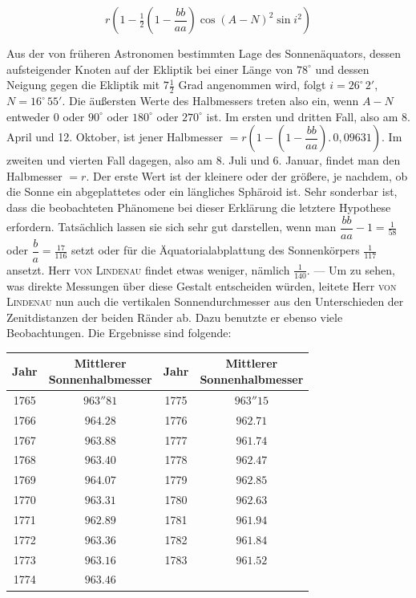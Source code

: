 \[ r\left(1-\tfrac{1}{2}\left(1-\frac{bb}{aa}\right)\cos(A-N)^2\sin i^2\right) \]

Aus der von früheren Astronomen bestimmten Lage des Sonnenäquators, dessen aufsteigender Knoten auf der Ekliptik bei einer Länge von $78^\circ$ und dessen Neigung gegen die Ekliptik mit $7\tfrac{1}{2}$ Grad angenommen wird, folgt $i = 26^\circ \, 2'$, $N = 16^\circ \, 55'$. Die äußersten Werte des Halbmessers treten also ein, wenn $A-N$ entweder $0$ oder $90^\circ$ oder $180^\circ$ oder $270^\circ$ ist. Im ersten und dritten Fall, also am 8. April und 12. Oktober, ist jener Halbmesser $= r\left(1-\left(1-\dfrac{bb}{aa}\right).\,0{,}09631\right)$. Im zweiten und vierten Fall dagegen, also am 8. Juli und 6. Januar, findet man den Halbmesser $= r$. Der erste Wert ist der kleinere oder der größere, je nachdem, ob die Sonne ein abgeplattetes oder ein längliches Sphäroid ist. Sehr sonderbar ist, dass die beobachteten Phänomene bei dieser Erklärung die letztere Hypothese erfordern. Tatsächlich lassen sie sich sehr gut darstellen, wenn man $\dfrac{bb}{aa}-1 = \tfrac{1}{58}$ oder $\dfrac{b}{a} = \tfrac{17}{116}$ setzt oder für die Äquatorialabplattung des Sonnenkörpers $\tfrac{1}{117}$ ansetzt. Herr \textsc{von Lindenau} findet etwas weniger, nämlich $\tfrac{1}{140}$. — Um zu sehen, was direkte Messungen über diese Gestalt entscheiden würden, leitete Herr \textsc{von Lindenau} nun auch die vertikalen Sonnendurchmesser aus den Unterschieden der Zenitdistanzen der beiden Ränder ab. Dazu benutzte er ebenso viele Beobachtungen. Die Ergebnisse sind folgende:

\begin{center}\begin{tabular}{c|c||c|c}
Jahr & \shortstack{Mittlerer\\Sonnenhalbmesser} & Jahr & \shortstack{Mittlerer\\Sonnenhalbmesser} \\ \hline
1765 & $963''81$ & 1775 & $963''15$ \\
1766 & $964.28$ & 1776 & $962.71$ \\
1767 & $963.88$ & 1777 & $961.74$ \\
1768 & $963.40$ & 1778 & $962.47$ \\
1769 & $964.07$ & 1779 & $962.85$ \\
1770 & $963.31$ & 1780 & $962.63$ \\
1771 & $962.89$ & 1781 & $961.94$ \\
1772 & $963.36$ & 1782 & $961.84$ \\
1773 & $963.16$ & 1783 & $961.52$ \\
1774 & $963.46$ & & \\
\end{tabular}\end{center}

